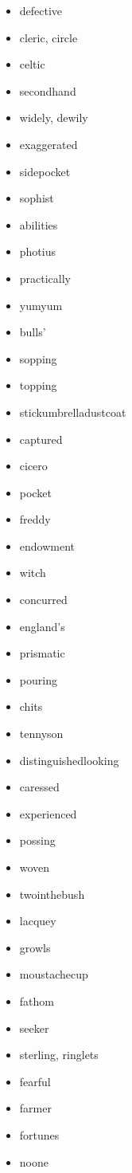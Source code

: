 \documentclass{article}
\begin{document}
\begin{itemize}
    \item defective
    \item cleric, circle
    \item celtic
    \item secondhand
    \item widely, dewily
    \item exaggerated
    \item sidepocket
    \item sophist
    \item abilities
    \item photius
    \item practically
    \item yumyum
    \item bulls'
    \item sopping
    \item topping
    \item stickumbrelladustcoat
    \item captured
    \item cicero
    \item pocket
    \item freddy
    \item endowment
    \item witch
    \item concurred
    \item england's
    \item prismatic
    \item pouring
    \item chits
    \item tennyson
    \item distinguishedlooking
    \item caressed
    \item experienced
    \item possing
    \item woven
    \item twointhebush
    \item lacquey
    \item growls
    \item moustachecup
    \item fathom
    \item seeker
    \item sterling, ringlets
    \item fearful
    \item farmer
    \item fortunes
    \item noone

\end{itemize}
\end{document}
